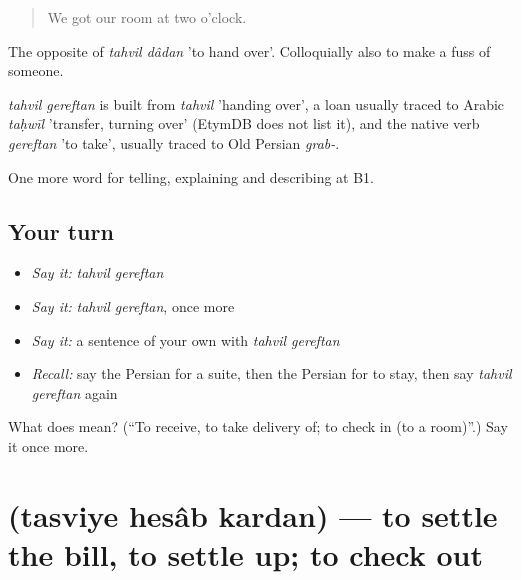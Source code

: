 \begin{quote}
We got our room at two o'clock.
\end{quote}

The opposite of \emph{tahvil dâdan} 'to hand over'. Colloquially also to make a fuss of someone.

\begin{cousinweb}
\emph{tahvil gereftan} is built from \emph{tahvil} 'handing over', a loan usually traced to Arabic \emph{taḥwīl} 'transfer, turning over' (EtymDB does not list it), and the native verb \emph{gereftan} 'to take', usually traced to Old Persian \emph{grab-}.
\end{cousinweb}

\begin{grammarlens}[title={What you've built}]
One more word for telling, explaining and describing at B1.
\end{grammarlens}

\subsection*{Your turn}
\begin{itemize}
\raggedright
  \item \emph{Say it:} \emph{tahvil gereftan}
  \item \emph{Say it:} \emph{tahvil gereftan}, once more
  \item \emph{Say it:} a sentence of your own with \emph{tahvil gereftan}
  \item \emph{Recall:} say the Persian for a suite, then the Persian for to stay, then say \emph{tahvil gereftan} again
\end{itemize}

\begin{tcolorbox}[breakable,colback=teal!4,colframe=teal!35!black,title={Before you move on}]
What does   mean? (\textquotedblleft{}To receive, to take delivery of; to check in (to a room)\textquotedblright{}.) Say it once more.
\end{tcolorbox}
\section[\texorpdfstring{\fa{تسویه} \fa{حساب} \fa{کردن} (tasviye hesâb kardan)}{تسویه حساب کردن (tasviye hesâb kardan)}]{   (tasviye hesâb kardan) — to settle the bill, to settle up; to check out}

\label{lesson:FA-C438-tasviye-hesab-kardan}



